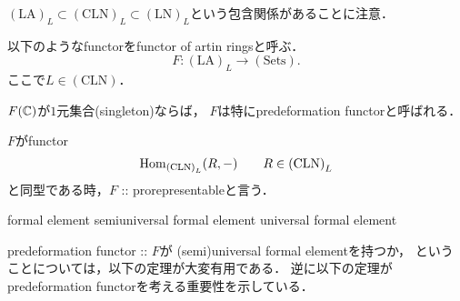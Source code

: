 \documentclass[a4paper]{jsarticle}
\newcommand{\LA}{\mathrm{(LA)}}
\newcommand{\LN}{\mathrm{(LN)}}
\newcommand{\CLN}{\mathrm{(CLN)}}
\begin{document}
    $\LA_L \subset \CLN_L \subset \LN_L$という包含関係があることに注意．

    \begin{Def}
        以下のようなfunctorをfunctor of artin ringsと呼ぶ．
        \[ F: \LA_L \to \mathrm{(Sets)}. \]
        ここで$L \in \CLN$．

        $F(\mathbb{C})$が$1$元集合(singleton)ならば，
        $F$は特にpredeformation functorと呼ばれる．

        $F$がfunctor
        \[ \Hom_{\CLN_L}(R, -) \qquad R \in \CLN_L \]
        と同型である時，$F$ :: prorepresentableと言う．

    \end{Def}

    \begin{Def}
        formal element
        semiuniversal formal element
        universal formal element
    \end{Def}

    predeformation functor :: $F$が
    (semi)universal formal elementを持つか，
    ということについては，以下の定理が大変有用である．
    逆に以下の定理がpredeformation functorを考える重要性を示している．

    \begin{Thm}
    \end{Thm}



\end{document}
